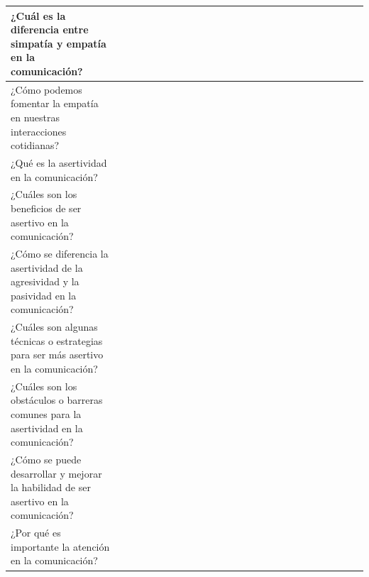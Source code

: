 \documentclass[12pt,a4paper]{article}
\begin{document}
\begin{landscape}
\begin{table}[ht!]
\begin{tabular}{|l|l|l|l|l|l|l|l|l|l|l|l|l|l|l|l|l|l|l|l|l|l|l|l|l|l|}
			¿Cuál es la diferencia entre simpatía y empatía en la comunicación?                                    &                                          &    &    &    &    &    &    &    &    &     &     &     &     &     &     &     &     &     &     &     &           \\\hline
			¿Cómo podemos fomentar la empatía en nuestras interacciones cotidianas?                                &                                          &    &    &    &    &    &    &    &    &     &     &     &     &     &     &     &     &     &     &     &           \\\hline
			¿Qué es la asertividad en la comunicación?                                                             &                                          &    &    &    &    &    &    &    &    &     &     &     &     &     &     &     &     &     &     &     &           \\\hline
			¿Cuáles son los beneficios de ser asertivo en la comunicación?                                         &                                          &    &    &    &    &    &    &    &    &     &     &     &     &     &     &     &     &     &     &     &           \\\hline
			¿Cómo se diferencia la asertividad de la agresividad y la pasividad en la comunicación?                &                                          &    &    &    &    &    &    &    &    &     &     &     &     &     &     &     &     &     &     &     &           \\\hline
			¿Cuáles son algunas técnicas o estrategias para ser más asertivo en la comunicación?                   &                                          &    &    &    &    &    &    &    &    &     &     &     &     &     &     &     &     &     &     &     &           \\\hline
			¿Cuáles son los obstáculos o barreras comunes para la asertividad en la comunicación?                  &                                          &    &    &    &    &    &    &    &    &     &     &     &     &     &     &     &     &     &     &     &           \\\hline
			¿Cómo se puede desarrollar y mejorar la habilidad de ser asertivo en la comunicación?                  &                                          &    &    &    &    &    &    &    &    &     &     &     &     &     &     &     &     &     &     &     &           \\\hline
			¿Por qué es importante la atención en la comunicación?                                                 &                                          &    &    &    &    &    &    &    &    &     &     &     &     &     &     &     &     &     &     &     &           \\\hline

\end{tabular}
\end{table}
\end{landscape}
\end{document}
